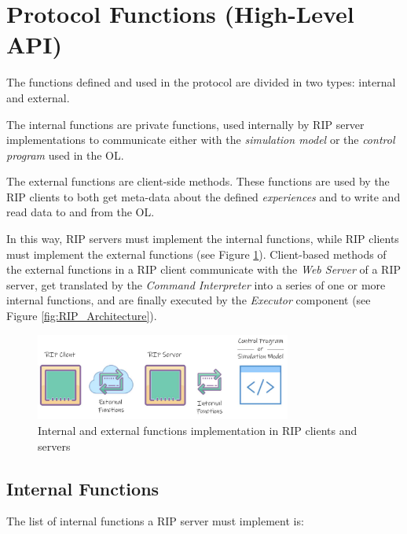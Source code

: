 \section{Protocol Functions (High-Level API)}
The functions defined and used in the protocol are divided in two types: internal and external.

The internal functions are private functions, used internally by RIP server implementations to communicate either with the \textit{simulation model} or the \textit{control program} used in the OL.

The external functions are client-side methods. These functions are used by the RIP clients to both get meta-data about the defined \textit{experiences} and to write and read data to and from the OL.

In this way, RIP servers must implement the internal functions, while RIP clients must implement the external functions (see Figure \ref{fig:Functions_Implementation}). Client-based methods of the external functions in a RIP client communicate with the \textit{Web Server} of a RIP server, get translated by the \textit{Command Interpreter} into a series of one or more internal functions, and are finally executed by the \textit{Executor} component (see Figure \ref{fig:RIP_Architecture}).

\begin{figure}[b!]
\centering
\includegraphics[width=0.75\textwidth]{images/FunctionsImplementation.pdf}
\caption{Internal and external functions implementation in RIP clients and servers}
\label{fig:Functions_Implementation}
\end{figure}

\subsection{Internal Functions}
\label{sec:Internal_Functions}
The list of internal functions a RIP server must implement is:

